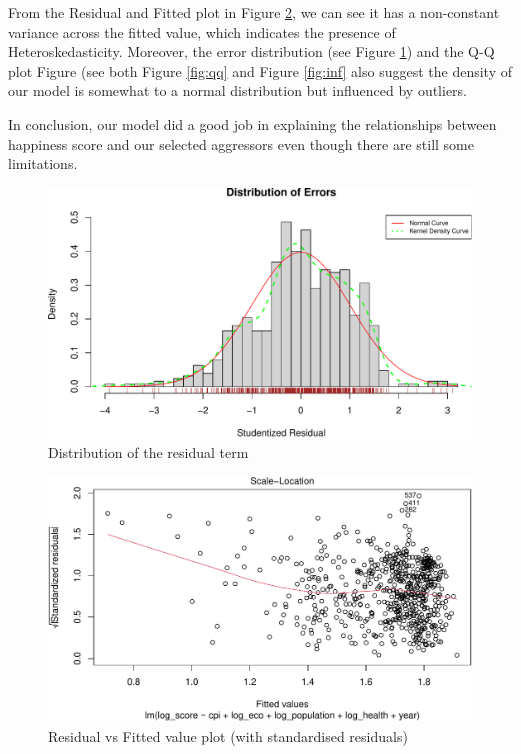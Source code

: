 \documentclass[11pt,a4paper,]{article}
\begin{document}
From the Residual and Fitted plot in Figure \ref{fig:resd}, we can see it has a non-constant variance across the fitted value, which indicates the presence of Heteroskedasticity. Moreover, the error distribution (see Figure \ref{fig:density}) and the Q-Q plot Figure (see both Figure \ref{fig:qq} and Figure \ref{fig:inf} also suggest the density of our model is somewhat to a normal distribution but influenced by outliers.

In conclusion, our model did a good job in explaining the relationships between happiness score and our selected aggressors even though there are still some limitations.

\begin{figure}
\centering
\includegraphics{Assignment4_files/figure-latex/density-1.pdf}
\caption{\label{fig:density}Distribution of the residual term}
\end{figure}

\begin{figure}
\centering
\includegraphics{Assignment4_files/figure-latex/resd-1.pdf}
\caption{\label{fig:resd}Residual vs Fitted value plot (with standardised residuals)}
\end{figure}
\end{document}
